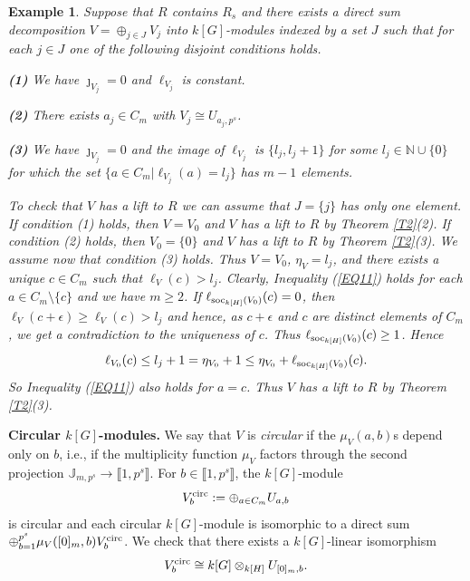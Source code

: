 \documentclass[11pt]{amsart}
\newtheorem{ex}[theorem]{Example}
\def\circul{\textup{circ}}
\def\soc{\textup{soc}}
\begin{document}
\begin{ex}\normalfont\label{EX3}
Suppose that $R$ contains $R_s$ and there exists a direct sum decomposition $V=\oplus_{j\in J} V_j$ into $k[G]$-modules indexed by a set $J$ such that for each $j\in J$ one of the following disjoint conditions holds. 

\medskip
{\bf (1)} We have $\jmath_{V_j}=0$ and $\ell_{V_j}$ is constant.

\smallskip
{\bf (2)} There exists $a_j\in C_m$ with $V_j\cong U_{a_j,p^s}$.

\smallskip
 {\bf (3)}  We have $\jmath_{V_j}=0$ and the image of $\ell_{V_j}$ is $\{l_j,l_j+1\}$ for some $l_j\in\mathbb N\cup\{0\}$ for which the set $\{a\in C_m|\ell_{V_j}(a)=l_j\}$ has $m-1$ elements.

\medskip
To check that $V$ has a lift to $R$ we can assume that $J=\{j\}$ has only one element. If condition (1) holds, then $V=V_0$ and $V$ has a lift to $R$ by Theorem \ref{T2}(2). If condition (2) holds, then $V_0=\{0\}$ and $V$ has a lift to $R$ by Theorem \ref{T2}(3). We assume now that condition (3) holds. Thus $V=V_0$, $\eta_V=l_j$, and there exists a unique $c\in C_m$ such that $\ell_V(c)>l_j$. Clearly, Inequality (\ref{EQ11}) holds for each $a\in C_m\setminus\{c\}$ and we have $m\ge 2$. If $\ell_{\soc_{k[H]}(V_0)}(c)=0$, then $\ell_{V}(c+\epsilon)\ge\ell_V(c)> l_j$ and hence, as $c+\epsilon$ and $c$ are distinct elements of $C_m$, we get a contradiction to the uniqueness of $c$. Thus $\ell_{\soc_{k[H]}(V_0)}(c)\ge 1$. Hence 
$$\ell_{V_0}(c)\le l_j+1=\eta_{V_0}+1\le \eta_{V_0}+\ell_{\soc_{k[H]}(V_0)}(c).$$ So Inequality (\ref{EQ11}) also holds for $a=c$. Thus $V$ has a lift to $R$ by Theorem \ref{T2}(3).  
\end{ex}

{\bf Circular $k[G]$-modules.} We say that $V$ is {\it circular} if the $\mu_V(a,b)$s depend only on $b$, i.e., if the multiplicity function $\mu_V$ factors through the second projection $\mathbb J_{m,p^s}\rightarrow \llbracket1,p^s\rrbracket$. For $b\in\llbracket1,p^s\rrbracket$, the $k[G]$-module 
$$V_b^{\circul}:=\oplus_{a\in C_m} U_{a,b}$$ 
is circular and each circular $k[G]$-module is isomorphic to a direct sum $\oplus_{b=1}^{p^s} \mu_V([0]_m,b) V_b^{\circul}$. We check that there exists a $k[G]$-linear isomorphism
\begin{equation}\label{EQ12}
V_b^{\circul}\cong k[G]\otimes_{k[H]} U_{[0]_m,b}.
\end{equation}
\end{document}
